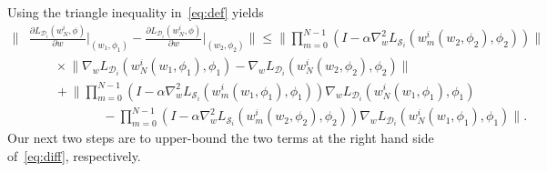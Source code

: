 \documentclass{osudissert96}
\begin{document}
Using the triangle inequality in~\cref{eq:def} yields
\begin{align}\label{eq:diff} 
\Big\| &\frac{\partial L_{\mathcal{D}_i}( w^i_N,\phi)}{\partial w} \Big |_{(w_1,\phi_1)} -  \frac{\partial L_{\mathcal{D}_i}( w^i_N,\phi)}{\partial w} \Big |_{(w_2,\phi_2)} \Big\| \leq  \Big\|\prod_{m=0}^{N-1}(I - \alpha \nabla_w^2L_{\mathcal{S}_i}(w_{m}^i(w_2,\phi_2),\phi_2)) \Big\| \nonumber
\\&\quad\quad\times\Big\|\nabla_{w} L_{\mathcal{D}_i} (w_{N}^i(w_1,\phi_1),\phi_1)-\nabla_{w} L_{\mathcal{D}_i} (w_{N}^i(w_2,\phi_2),\phi_2)\Big\| \nonumber
\\ &\quad\quad+\Big\|\prod_{m=0}^{N-1}(I - \alpha \nabla_w^2L_{\mathcal{S}_i}(w_{m}^i(w_1,\phi_1),\phi_1)) \nabla_{w} L_{\mathcal{D}_i} (w_{N}^i(w_1,\phi_1),\phi_1)\nonumber
\\&\quad\hspace{2cm}-\prod_{m=0}^{N-1}(I - \alpha \nabla_w^2L_{\mathcal{S}_i}(w_{m}^i(w_2,\phi_2),\phi_2)) \nabla_{w} L_{\mathcal{D}_i} (w_{N}^i(w_1,\phi_1),\phi_1)\Big\|. 
\end{align}
Our next two steps are to upper-bound the two terms at the right hand side of~\cref{eq:diff}, respectively.
\end{document}
